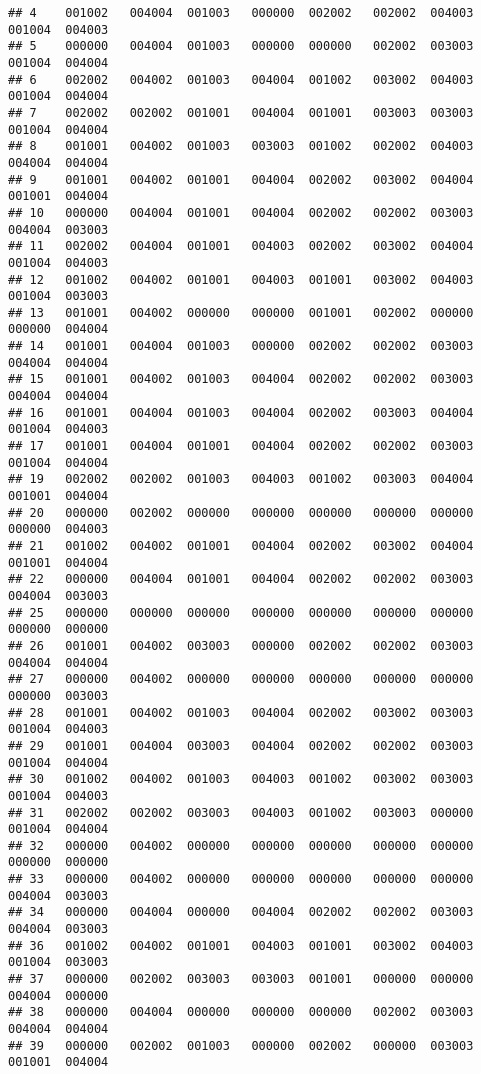 \documentclass[
]{article}
\begin{document}
\begin{verbatim}
## 4    001002   004004  001003   000000  002002   002002  004003   001004  004003
## 5    000000   004004  001003   000000  000000   002002  003003   001004  004004
## 6    002002   004002  001003   004004  001002   003002  004003   001004  004004
## 7    002002   002002  001001   004004  001001   003003  003003   001004  004004
## 8    001001   004002  001003   003003  001002   002002  004003   004004  004004
## 9    001001   004002  001001   004004  002002   003002  004004   001001  004004
## 10   000000   004004  001001   004004  002002   002002  003003   004004  003003
## 11   002002   004004  001001   004003  002002   003002  004004   001004  004003
## 12   001002   004002  001001   004003  001001   003002  004003   001004  003003
## 13   001001   004002  000000   000000  001001   002002  000000   000000  004004
## 14   001001   004004  001003   000000  002002   002002  003003   004004  004004
## 15   001001   004002  001003   004004  002002   002002  003003   004004  004004
## 16   001001   004004  001003   004004  002002   003003  004004   001004  004003
## 17   001001   004004  001001   004004  002002   002002  003003   001004  004004
## 19   002002   002002  001003   004003  001002   003003  004004   001001  004004
## 20   000000   002002  000000   000000  000000   000000  000000   000000  004003
## 21   001002   004002  001001   004004  002002   003002  004004   001001  004004
## 22   000000   004004  001001   004004  002002   002002  003003   004004  003003
## 25   000000   000000  000000   000000  000000   000000  000000   000000  000000
## 26   001001   004002  003003   000000  002002   002002  003003   004004  004004
## 27   000000   004002  000000   000000  000000   000000  000000   000000  003003
## 28   001001   004002  001003   004004  002002   003002  003003   001004  004003
## 29   001001   004004  003003   004004  002002   002002  003003   001004  004004
## 30   001002   004002  001003   004003  001002   003002  003003   001004  004003
## 31   002002   002002  003003   004003  001002   003003  000000   001004  004004
## 32   000000   004002  000000   000000  000000   000000  000000   000000  000000
## 33   000000   004002  000000   000000  000000   000000  000000   004004  003003
## 34   000000   004004  000000   004004  002002   002002  003003   004004  003003
## 36   001002   004002  001001   004003  001001   003002  004003   001004  003003
## 37   000000   002002  003003   003003  001001   000000  000000   004004  000000
## 38   000000   004004  000000   000000  000000   002002  003003   004004  004004
## 39   000000   002002  001003   000000  002002   000000  003003   001001  004004

\end{verbatim}
\end{document}

